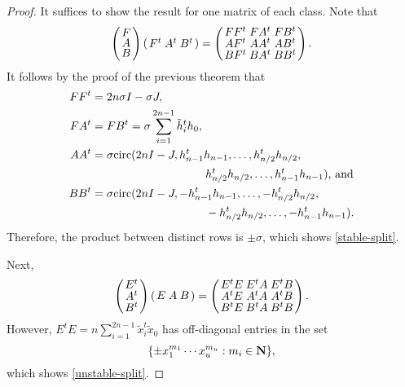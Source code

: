\documentclass[../../../main]{subfiles}
\begin{document}
 \begin{proof}
  It suffices to show the result for one matrix of each class. Note that
  \[
  \arraycolsep=1.25pt\def\arraystretch{0.625}
   \left(\begin{array}{c}
    F \\ A \\ B
   \end{array}\right)
   \arraycolsep=1.25pt\def\arraystretch{0.625}
   \left(\begin{array}{ccc}
    F^t & A^t & B^t
   \end{array}\right)
   =
   \arraycolsep=1.25pt\def\arraystretch{0.625}
   \left(\begin{array}{ccc}
    FF^t & FA^t & FB^t \\
    AF^t & AA^t & AB^t \\
    BF^t & BA^t & BB^t
   \end{array}\right).
  \]
  It follows by the proof of the previous theorem that 
  \begin{align*}
  FF^t &= 2n\sigma I - \sigma J, \\ 
  FA^t &= FB^t = \sigma\sum_{i=1}^{2n-1}\tilde h_i^th_0, \\
  AA^t &= \sigma\text{circ}(2nI-J,h_{n-1}^th_{n-1}, \dots, h_{n/2}^th_{n/2}, \\ 
   &\qquad\qquad\qquad\qquad\qquad h_{n/2}^th_{n/2},\dots,h_{n-1}^th_{n-1}) \text{, and} \\
  BB^t &= \sigma\text{circ}(2nI-J,-h_{n-1}^th_{n-1}, \dots, -h_{n/2}^th_{n/2},\\ 
   &\qquad\qquad\qquad\qquad\qquad -h_{n/2}^th_{n/2},\dots,-h_{n-1}^th_{n-1}). 
  \end{align*}
  Therefore, the product between distinct rows is $\pm \sigma$, which shows \ref{stable-split}.
  
  Next,
  \[
  \arraycolsep=1.25pt\def\arraystretch{0.625}
   \left(\begin{array}{c}
    E^t \\ A^t \\ B^t
   \end{array}\right)
   \arraycolsep=1.25pt\def\arraystretch{0.625}
   \left(\begin{array}{ccc}
    E&A&B
   \end{array}\right)
   =
   \arraycolsep=1.25pt\def\arraystretch{0.625}
   \left(\begin{array}{ccc}
    E^tE & E^tA & E^tB \\
    A^tE & A^tA & A^tB \\
    B^tE & B^tA & B^tB
   \end{array}\right).
  \]
  However, $E^tE=n\sum_{i=1}^{2n-1}\tilde x_i^t \tilde x_0$ has off-diagonal entries in the set
  \[
    \{\pm x_1^{m_1} \cdots x_u^{m_u} : m_i \in \mathbf{N}\},
  \]
  which shows \ref{unstable-split}.
 \end{proof}
 
\end{document}
